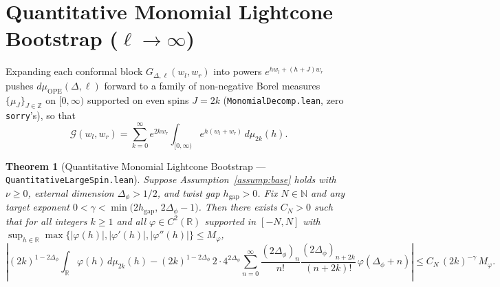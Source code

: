 \documentclass[10pt,a4paper]{article}
\newtheorem{theorem}{Theorem}
\theoremstyle{definition}
\begin{document}
\section{Quantitative Monomial Lightcone Bootstrap (\texorpdfstring{$\ell \to \infty$}{l -> infty})}

Expanding each conformal block $G_{\Delta, \ell}(w_l, w_r)$ into powers $e^{h w_l + (h + J) w_r}$ pushes $d\mu_{\mathrm{OPE}}(\Delta, \ell)$ forward to a family of non-negative Borel measures $\{\mu_J\}_{J \in \mathbb{Z}}$ on $[0, \infty)$ supported on even spins $J = 2k$ (\texttt{MonomialDecomp.lean}, zero \texttt{sorry}'s), so that
\begin{equation}
  \mathcal{G}(w_l, w_r) = \sum_{k=0}^\infty e^{2k w_r} \int_{[0, \infty)} e^{h(w_l + w_r)} \, d\mu_{2k}(h).
\end{equation}

\begin{theorem}[Quantitative Monomial Lightcone Bootstrap --- \texttt{QuantitativeLargeSpin.lean}]
\label{thm:monomial-bootstrap}
Suppose Assumption~\ref{assump:base} holds with $\nu \ge 0$, external dimension $\Delta_\phi > 1/2$, and twist gap $h_{\mathrm{gap}} > 0$. Fix $N \in \mathbb{N}$ and any target exponent $0 < \gamma < \min\bigl(2 h_{\mathrm{gap}},\, 2\Delta_\phi - 1\bigr)$. Then there exists $C_N > 0$ such that for all integers $k \ge 1$ and all $\varphi \in C^2(\mathbb{R})$ supported in $[-N, N]$ with $\sup_{h \in \mathbb{R}} \max\{|\varphi(h)|, |\varphi'(h)|, |\varphi''(h)|\} \le M_\varphi$,
\begin{equation}
  \label{eq:monomial-bootstrap}
  \left|(2k)^{1 - 2\Delta_\phi} \int_{\mathbb{R}} \varphi(h) \, d\mu_{2k}(h)
    - (2k)^{1 - 2\Delta_\phi} \, 2 \cdot 4^{2\Delta_\phi} \sum_{n=0}^{\infty} \frac{(2\Delta_\phi)_n}{n!} \frac{(2\Delta_\phi)_{n + 2k}}{(n + 2k)!} \, \varphi(\Delta_\phi + n)\right|
  \le C_N \, (2k)^{-\gamma} \, M_\varphi.
\end{equation}
\end{theorem}
\end{document}
